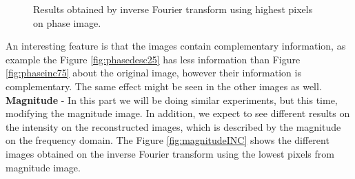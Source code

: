 \documentclass[12pt,a4paper]{article}
\begin{document}
\begin{figure}[!h]
{{		}
		\label{fig:phasedesc50}
	}
	\quad
	
	\caption{Results obtained by inverse Fourier transform using highest pixels on phase image.}
	\label{fig:phaseDESC}
\end{figure}

An interesting feature is that the images contain complementary information, as example the Figure \ref{fig:phasedesc25} has less information than Figure \ref{fig:phaseinc75} about the original image, however their information is complementary. The same effect might be seen in the other images as well. \\
	
\textbf{ Magnitude} -  In this part we will be doing similar experiments, but this time, modifying the magnitude image. In addition, we expect to see different results on the intensity on the reconstructed images, which is described by the magnitude on the frequency domain. The Figure \ref{fig:magnitudeINC} shows the different images obtained on the inverse Fourier transform using the lowest pixels from magnitude image. \\
\end{document}
